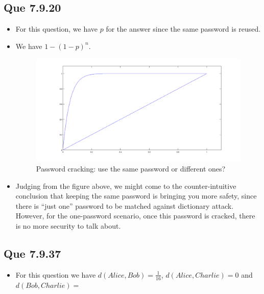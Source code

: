 \documentclass{article}
\begin{document}
\subsection{Que 7.9.20}
\label{sec:que-7.9.20}

\begin{itemize}
\item For this question, we have $p$ for the answer since the same
  password is reused.
\item We have $1-{(1-p)}^{n}$.
  \begin{figure}[htbp]
    \centering
    \includegraphics[scale=0.25]{Toy-Birthday-1}
    \caption{Password cracking: use the same password or different ones?}
\label{fig:toy-birthday-attack-1}
  \end{figure}
\item Judging from the figure above, we might come to the
  counter-intuitive conclusion that keeping the same password is
  bringing you more safety, since there is ``just one'' password to be
  matched against dictionary attack. However, for the one-password
  scenario, once this password is cracked, there is no more security
  to talk about.
\end{itemize}

\subsection{Que 7.9.37}
\label{sec:que-7.9.37}

\begin{itemize}
\item For this question we have $d(Alice,Bob)=\frac{1}{16}$, $d(Alice,
  Charlie)=0$ and $d(Bob,Charlie)=$
\end{itemize}












\end{document}
